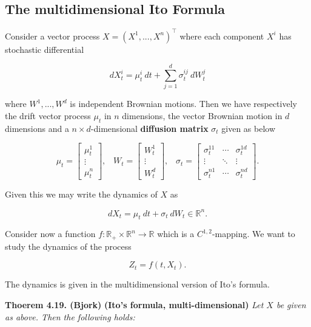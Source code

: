 \documentclass[a4paper,12pt,openany]{book}
\begin{document}
\hypertarget{the-multidimensional-ito-formula}{%
\subsection{The multidimensional Ito Formula}\label{the-multidimensional-ito-formula}}

Consider a vector process \(X=(X^1,...,X^n)^\top\) where each component \(X^i\) has stochastic differential

\[
d X_t^i=\mu_t^i\ dt+\sum_{j=1}^d\sigma^{ij}_t\ dW_t^j
\]

where \(W^1,...,W^d\) is independent Brownian motions. Then we have respectively the drift vector process \(\mu_t\) in \(n\) dimensions, the vector Brownian motion in \(d\) dimensions and a \(n\times d\)-dimensional \textbf{diffusion matrix} \(\sigma_t\) given as below

\[
\mu_t=\begin{bmatrix}\mu^1_t\\ \vdots\\ \mu^n_t\end{bmatrix},\hspace{10pt}W_t=\begin{bmatrix}W^1_t\\ \vdots\\ W^d_t\end{bmatrix},\hspace{10pt}\sigma_t=\begin{bmatrix}\sigma^{11}_t & \cdots & \sigma^{1d}_t \\ \vdots & \ddots & \vdots\\ \sigma^{n1}_t &\cdots& \sigma^{nd}_t\end{bmatrix}.
\]

Given this we may write the dynamics of \(X\) as

\[
d X_t=\mu_t\ dt+\sigma_t\ dW_t\in\mathbb{R}^n.
\]

Consider now a function \(f:\mathbb{R}_+\times \mathbb{R}^n\to\mathbb{R}\) which is a \(C^{1,2}\)-mapping. We want to study the dynamics of the process

\[
Z_t=f(t,X_t).
\]

The dynamics is given in the multidimensional version of Ito's formula.

\textbf{Thoerem 4.19. (Bjork)} \textbf{(Ito's formula, multi-dimensional)} \emph{Let \(X\) be given as above. Then the following holds:}
\end{document}
